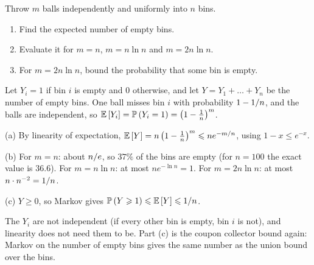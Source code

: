 \begin{exercisebox}
\begin{pproblem}\label{pp:empty}
    Throw $m$ balls independently and uniformly into $n$ bins.
    \begin{enumerate}[label=(\alph*)]
        \item Find the expected number of empty bins.
        \item Evaluate it for $m = n$, $m = n \ln n$ and $m = 2n \ln n$.
        \item For $m = 2n \ln n$, bound the probability that some bin is empty.
    \end{enumerate}
\end{pproblem}
\tcblower
\begin{wsolution}
    Let $Y_i = 1$ if bin $i$ is empty and $0$ otherwise, and let $Y = Y_1 + \dots + Y_n$ be the
    number of empty bins. One ball misses bin $i$ with probability $1 - 1/n$, and the balls
    are independent, so
    $\operatorname{\mathbb{E}}\left[Y_i\right] = \operatorname{\mathbb{P}}\left(Y_i = 1\right) = \left(1 - \frac{1}{n}\right)^m$.

    (a) By linearity of expectation,
    $\operatorname{\mathbb{E}}\left[Y\right] = n\left(1 - \frac{1}{n}\right)^m \leqslant n e^{-m/n}$, using $1 - x \leq e^{-x}$.

    (b) For $m = n$: about $n/e$, so $37\%$ of the bins are empty (for $n = 100$ the exact
    value is $36.6$). For $m = n \ln n$: at most $n e^{-\ln n} = 1$. For $m = 2n \ln n$: at most
    $n \cdot n^{-2} = 1/n$.

    (c) $Y \geq 0$, so Markov gives $\operatorname{\mathbb{P}}\left(Y \geqslant 1\right) \leqslant \operatorname{\mathbb{E}}\left[Y\right] \leqslant 1/n$.

    The $Y_i$ are not independent (if every other bin is empty, bin $i$ is not), and linearity does
    not need them to be. Part (c) is the coupon collector bound again: Markov on the number of empty
    bins gives the same number as the union bound over the bins.
\end{wsolution}
\end{exercisebox}

